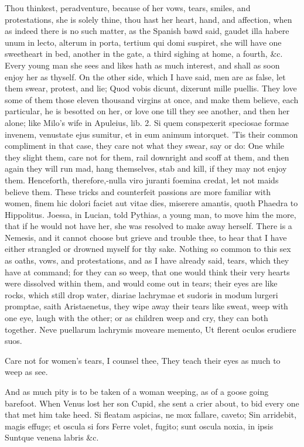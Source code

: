 {Thou thinkest, peradventure, because of her vows, tears, smiles, and
protestations, she is solely thine, thou hast her heart, hand, and
affection, when as indeed there is no such matter, as the Spanish
bawd said, gaudet illa habere unum in lecto, alterum in porta, tertium
qui domi suspiret, she will have one sweetheart in bed, another in the
gate, a third sighing at home, a fourth, \&c. Every young man she sees
and likes hath as much interest, and shall as soon enjoy her as
thyself. On the other side, which I have said, men are as false, let
them swear, protest, and lie; Quod vobis dicunt, dixerunt mille
puellis. They love some of them those eleven thousand virgins at once,
and make them believe, each particular, he is besotted on her, or love
one till they see another, and then her alone; like Milo's wife in
Apuleius, lib. 2. Si quem conspexerit speciosae formae invenem,
venustate ejus sumitur, et in eum animum intorquet. 'Tis their common
compliment in that case, they care not what they swear, say or do: One
while they slight them, care not for them, rail downright and scoff at
them, and then again they will run mad, hang themselves, stab and kill,
if they may not enjoy them. Henceforth, therefore,-nulla viro juranti
foemina credat, let not maids believe them. These tricks and
counterfeit passions are more familiar with women, finem hic
dolori faciet aut vitae dies, miserere amantis, quoth Phaedra to
Hippolitus. Joessa, in Lucian, told Pythias, a young man, to move
him the more, that if he would not have her, she was resolved to make
away herself. There is a Nemesis, and it cannot choose but grieve and
trouble thee, to hear that I have either strangled or drowned myself
for thy sake. Nothing so common to this sex as oaths, vows, and
protestations, and as I have already said, tears, which they have at
command; for they can so weep, that one would think their very hearts
were dissolved within them, and would come out in tears; their eyes are
like rocks, which still drop water, diariae lachrymae et sudoris in
modum lurgeri promptae, saith  Aristaenetus, they wipe away their
tears like sweat, weep with one eye, laugh with the other; or as
children weep and cry, they can both together.
Neve puellarum lachrymis moveare memento,
Ut flerent oculos erudiere suos.

Care not for women's tears, I counsel thee,
They teach their eyes as much to weep as see.

And as much pity is to be taken of a woman weeping, as of a goose going
barefoot. When Venus lost her son Cupid, she sent a crier about, to bid
every one that met him take heed.
Si fleatam aspicias, ne mox fallare, caveto;
Sin arridebit, magis effuge; et oscula si fors
Ferre volet, fugito; sunt oscula noxia, in ipsis
Suntque venena labris \&c.

}
